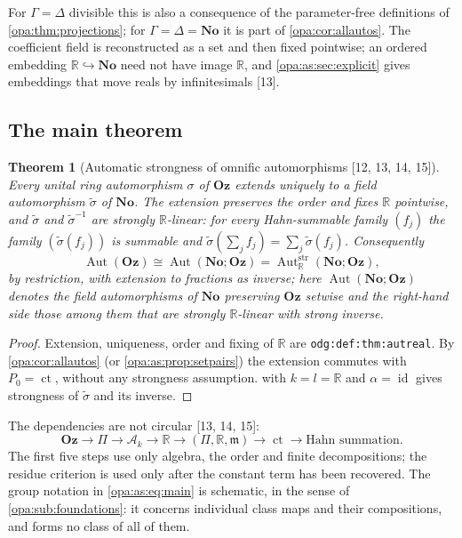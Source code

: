 \documentclass[11pt,oneside]{article}
\numberwithin{equation}{section}
\newtheorem{theorem}{Theorem}[section]
\theoremstyle{definition}
\theoremstyle{remark}
\newcommand{\No}{\mathbf{No}}
\newcommand{\Oz}{\mathbf{Oz}}
\newcommand{\R}{\mathbb R}
\newcommand{\Ak}{\mathcal A_k}
\newcommand{\mm}{\mathfrak m}
\newcommand{\Aut}{\operatorname{Aut}}
\newcommand{\ct}{\operatorname{ct}}
\newcommand{\id}{\operatorname{id}}
\newcommand{\src}[1]{\textup{\textsf{\small[#1]}}}
\newcommand{\lbl}[1]{\nolinkurl{#1}}
\begin{document}
For $\Gamma=\Delta$ divisible this is also a consequence of the parameter-free definitions
of \cref{opa:thm:projections}; for $\Gamma=\Delta=\No$ it is part of
\cref{opa:cor:allautos}. The coefficient field is reconstructed as a set and then fixed
pointwise; an ordered embedding $\R\hookrightarrow\No$ need not have image $\R$, and
\cref{opa:as:sec:explicit} gives embeddings that move reals by infinitesimals \src{13}.

\subsection{The main theorem}

\begin{theorem}[Automatic strongness of omnific automorphisms \src{12, 13, 14, 15}]\label{opa:as:thm:main}
Every unital ring automorphism $\sigma$ of $\Oz$ extends uniquely to a field automorphism
$\widetilde\sigma$ of $\No$. The extension preserves the order and fixes $\R$ pointwise,
and $\widetilde\sigma$ and $\widetilde\sigma^{-1}$ are strongly $\R$-linear: for every
Hahn-summable family $(f_j)$ the family $(\widetilde\sigma(f_j))$ is summable and
$\widetilde\sigma(\sum_jf_j)=\sum_j\widetilde\sigma(f_j)$. Consequently
\begin{equation}\label{opa:as:eq:main}
 \Aut(\Oz)\cong\Aut(\No;\Oz)=\Aut^{\mathrm{str}}_\R(\No;\Oz),
\end{equation}
by restriction, with extension to fractions as inverse; here $\Aut(\No;\Oz)$ denotes the
field automorphisms of $\No$ preserving $\Oz$ setwise and the right-hand side those among
them that are strongly $\R$-linear with strong inverse.
\end{theorem}
\begin{proof}
Extension, uniqueness, order and fixing of $\R$ are \lbl{odg:def:thm:autreal}. By
\cref{opa:cor:allautos} (or \cref{opa:as:prop:setpairs}) the extension commutes with
$P_0=\ct$, without any strongness assumption.  with
$k=l=\R$ and $\alpha=\id$ gives strongness of $\widetilde\sigma$ and its inverse.
\end{proof}

The dependencies are not circular \src{13, 14, 15}:
\[
 \Oz\longrightarrow\Pi\longrightarrow\Ak\longrightarrow\R\longrightarrow
 (\Pi,\R,\mm)\longrightarrow\ct\longrightarrow\text{Hahn summation}.
\]
The first five steps use only algebra, the order and finite decompositions; the residue
criterion is used only after the constant term has been recovered. The group notation in
\eqref{opa:as:eq:main} is schematic, in the sense of \cref{opa:sub:foundations}: it
concerns individual class maps and their compositions, and forms no class of all of them.
\end{document}
